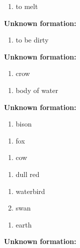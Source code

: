 \begin{enumerate}
\item to melt
\end{enumerate}
\noindent\textbf{Unknown formation:}\\

\begin{enumerate}
\item to be dirty
\end{enumerate}
\noindent\textbf{Unknown formation:}\\

\begin{enumerate}
\item crow
\end{enumerate}
\begin{enumerate}
\item body of water
\end{enumerate}
\noindent\textbf{Unknown formation:}\\

\begin{enumerate}
\item bison
\end{enumerate}
\begin{enumerate}
\item fox
\end{enumerate}
\begin{enumerate}
\item cow
\end{enumerate}
\begin{enumerate}
\item dull red
\end{enumerate}
\begin{enumerate}
\item waterbird
\item swan
\end{enumerate}
\begin{enumerate}
\item earth
\end{enumerate}
\noindent\textbf{Unknown formation:}\\

